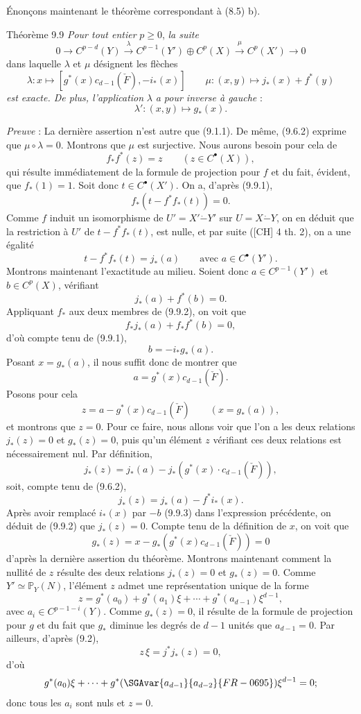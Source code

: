 Énonçons maintenant le théorème correspondant à (8.5) b).

\begin{statement}{Théorème 9.9}
\emph{Pour tout entier} $p\ge0$, \emph{la suite}
\[
0\to C^{p-d}(Y)\xrightarrow{\lambda} C^{p-1}(Y')\oplus C^p(X)\xrightarrow{\mu} C^p(X')\to0
\]
dans laquelle $\lambda$ et $\mu$ désignent les flèches
\[
\lambda:x\mapsto[g^*(x)c_{d-1}(\check F),-i_*(x)]
\qquad
\mu:(x,y)\mapsto j_*(x)+f^*(y)
\]
\emph{est exacte. De plus, l'application} $\lambda$ \emph{a pour inverse à gauche} :
\[
\lambda':(x,y)\mapsto g_*(x).
\]
\end{statement}

\emph{Preuve} : La dernière assertion n'est autre que (9.1.1). De même, (9.6.2) exprime que $\mu\circ\lambda=0$. Montrons que $\mu$ est surjective. Nous aurons besoin pour cela de
\[
f_*f^*(z)=z\qquad(z\in C^{\bullet}(X)),
\tag{9.9.1}
\]
qui résulte immédiatement de la formule de projection pour $f$ et du fait, évident, que $f_*(1)=1$. Soit donc $t\in C^{\bullet}(X')$. On a, d'après (9.9.1),
\[
f_*(t-f^*f_*(t))=0.
\]
Comme $f$ induit un isomorphisme de $U'=X'\mathbin{\dot{-}}Y'$ sur $U=X\mathbin{\dot{-}}Y$, on en déduit que la
restriction à $U'$ de $t-f^*f_*(t)$, est nulle, et par suite ([CH] 4 th. 2), on a une égalité
\[
t-f^*f_*(t)=j_*(a)
\qquad\text{avec }a\in C^{\bullet}(Y').
\]
Montrons maintenant l'exactitude au milieu. Soient donc $a\in C^{p-1}(Y')$ et $b\in C^p(X)$, vérifiant
\[
j_*(a)+f^*(b)=0.
\tag{9.9.2}
\]
Appliquant $f_*$ aux deux membres de (9.9.2), on voit que
\[
f_*j_*(a)+f_*f^*(b)=0,
\]
d'où compte tenu de (9.9.1),
\[
b=-i_*g_*(a).
\tag{9.9.3}
\]
Posant $x=g_*(a)$, il nous suffit donc de montrer que
\[
a=g^*(x)c_{d-1}(\check F).
\tag{9.9.4}
\]
Posons pour cela
\[
z=a-g^*(x)c_{d-1}(\check F)\qquad(x=g_*(a)),
\]
et montrons que $z=0$. Pour ce faire, nous allons voir que l'on a les deux relations $j_*(z)=0$ et $g_*(z)=0$, puis qu'un élément $z$ vérifiant ces deux relations est nécessairement nul. Par définition,
\[
j_*(z)=j_*(a)-j_*(g^*(x)\cdot c_{d-1}(\check F)),
\]
soit, compte tenu de (9.6.2),
\[
j_*(z)=j_*(a)-f^*i_*(x).
\]
Après avoir remplacé $i_*(x)$ par $-b$ (9.9.3) dans l'expression précédente, on déduit de (9.9.2) que $j_*(z)=0$. Compte tenu de la définition de $x$, on voit que
\[
g_*(z)=x-g_*(g^*(x)c_{d-1}(\check F))=0
\]
d'après la dernière assertion du théorème. Montrons maintenant comment la nullité 
de $z$
résulte des deux relations $j_*(z)=0$ et $g_*(z)=0$. Comme $Y'\simeq\mathbb{P}_Y(N)$, l'élément $z$ admet une représentation unique de la forme
\[
z=g^*(a_0)+g^*(a_1)\xi+\cdots+g^*(a_{d-1})\xi^{d-1},
\]
avec $a_i\in C^{p-1-i}(Y)$. Comme $g_*(z)=0$, il résulte de la formule de projection pour $g$ et du fait que $g_*$ diminue les degrés de $d-1$ unités que $a_{d-1}=0$. Par ailleurs, d'après (9.2),
\[
z\,\xi=j^*j_*(z)=0,
\]
d'où
\[
g^*(a_0)\xi+\cdots+g^*(\SGAvar{a_{d-1}}{a_{d-2}}{FR-0695})\xi^{d-1}=0;
\]
donc tous les $a_i$ sont nuls et $z=0$.

